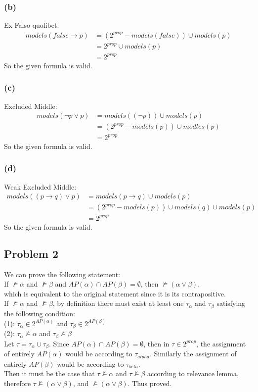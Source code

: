 \documentclass[12pt]{article}
\begin{document}
\subsubsection*{(b)}
Ex Falso quolibet:
\begin{align*}
    models(false \rightarrow p) & = (2^{prop} - models(false)) \cup models(p)\\
    & =2^{prop} \cup models(p) \\
    & = 2^{prop}
\end{align*}
So the given formula is valid. 
\subsubsection*{(c)}
Excluded Middle:
\begin{align*}
    models(\neg p \vee p) &= models((\neg p)) \cup models(p) \\
    & = (2^{prop} - models(p)) \cup modles(p)\\
    & = 2^{prop}
\end{align*}
So the given formula is valid. 
\subsubsection*{(d)}
Weak Excluded Middle:
\begin{align*}
    models( (p \rightarrow q) \vee p) &= models(p \rightarrow q) \cup models(p) \\
    & = (2^{prop} - models(p)) \cup models(q) \cup models (p)\\
    & = 2^{prop}
\end{align*}
So the given formula is valid.
\subsection*{Problem 2}
We can prove the following statement: \\
If $\nvDash \alpha$ and $\nvDash \beta$ and $AP(\alpha) \cap AP(\beta) = \emptyset$, then $\nvDash (\alpha \vee \beta)$.\\
which is equivalent to the original statement since it is its contrapositive.\\[5pt]
If $\nvDash \alpha$ and $\nvDash \beta$, by definition there must exist at least one $\tau_{\alpha}$ and $\tau_{\beta}$ satisfying the following condition: \\
(1): $\tau_{\alpha} \in 2^{AP(\alpha)}$ and  $\tau_{\beta} \in 2^{AP(\beta)}$ \\
(2): $\tau_{\alpha} \nvDash \alpha$ and $\tau_{\beta} \nvDash \beta$\\
Let $\tau = \tau_{\alpha} \cup \tau_{\beta}$. Since $AP(\alpha) \cap AP(\beta) = \emptyset$, then in $\tau \in 2^{prop}$, the assignment of entirely $AP(\alpha)$ would be according to $\tau_{alpha}$. Similarly the assignment of entirely $AP(\beta)$ would be according to $\tau_{beta}$.\\
Then it must be the case that $\tau \nvDash \alpha$ and $\tau \nvDash \beta$ according to relevance lemma, therefore $\tau \nvDash (\alpha \vee \beta)$, and $\nvDash (\alpha \vee \beta)$.
Thus proved. 
\newpage
\end{document}
